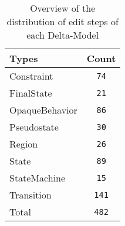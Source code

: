 \begin{table} 
 \center 
 \small 
\begin{tabular}{|l|c|}
\hline
Types & Count\\ 
  \hline 
Constraint & \texttt{74}\\ 
  \hline 
FinalState & \texttt{21}\\ 
  \hline 
OpaqueBehavior & \texttt{86}\\ 
  \hline 
Pseudostate & \texttt{30}\\ 
  \hline 
Region & \texttt{26}\\ 
  \hline 
State & \texttt{89}\\ 
  \hline 
StateMachine & \texttt{15}\\ 
  \hline 
Transition & \texttt{141}\\ 
  \hline 
Total & \texttt{482}\\ 
  \hline 
\end{tabular}
\caption[Overview: Delta-Models]{Overview of the distribution of edit steps of each Delta-Model}
\end{table}

